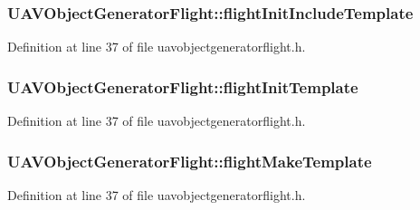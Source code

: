 \hypertarget{class_u_a_v_object_generator_flight_a50b6f448b3e2e2da03d81d63e663d242}{
\subsubsection[{flight\-Init\-Include\-Template}]{ U\-A\-V\-Object\-Generator\-Flight\-::flight\-Init\-Include\-Template}}\label{class_u_a_v_object_generator_flight_a50b6f448b3e2e2da03d81d63e663d242}


Definition at line 37 of file uavobjectgeneratorflight.\-h.

\hypertarget{class_u_a_v_object_generator_flight_acff74a9be8ad7813ad294a48755e6bbc}{
\subsubsection[{flight\-Init\-Template}]{ U\-A\-V\-Object\-Generator\-Flight\-::flight\-Init\-Template}}\label{class_u_a_v_object_generator_flight_acff74a9be8ad7813ad294a48755e6bbc}


Definition at line 37 of file uavobjectgeneratorflight.\-h.

\hypertarget{class_u_a_v_object_generator_flight_acdf4c6c02d4dfc2c5eb57916d01d4578}{
\subsubsection[{flight\-Make\-Template}]{ U\-A\-V\-Object\-Generator\-Flight\-::flight\-Make\-Template}}\label{class_u_a_v_object_generator_flight_acdf4c6c02d4dfc2c5eb57916d01d4578}


Definition at line 37 of file uavobjectgeneratorflight.\-h.

